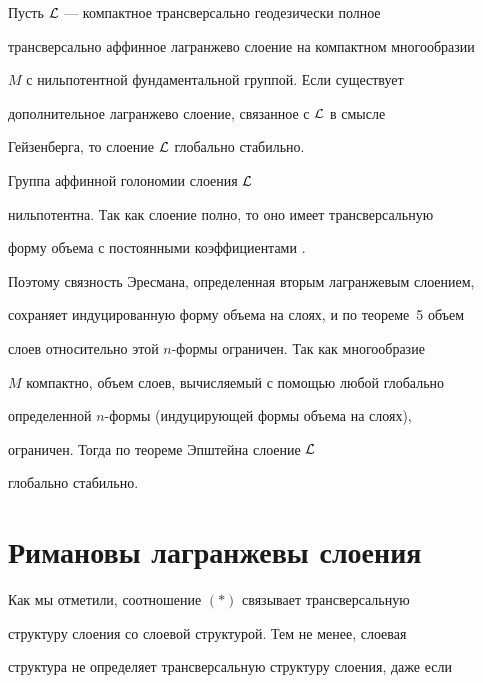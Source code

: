 \begin{thm}


Пусть $\cal L$ --- компактное трансверсально геодезически полное


трансверсально аффинное лагранжево слоение на компактном многообразии


$M$ с нильпотентной фундаментальной группой. Если существует


дополнительное лагранжево слоение, связанное с $\cal L$ в смысле


Гейзенберга, то слоение $\cal L$ глобально стабильно.


\end{thm}





\begin{pf} Группа аффинной голономии слоения $\cal L$


нильпотентна. Так как слоение полно, то оно имеет трансверсальную


форму объема с постоянными коэффициентами \cite{WO6}.


Поэтому связность Эресмана, определенная вторым лагранжевым слоением,


сохраняет индуцированную форму объема на слоях, и по теореме~5 объем


слоев относительно этой $n$-формы ограничен. Так как многообразие


$M$ компактно, объем слоев, вычисляемый с помощью любой глобально


определенной $n$-формы (индуцирующей формы объема на слоях),


ограничен. Тогда по теореме Эпштейна \cite{EP} слоение $\cal L$


глобально стабильно.


\end{pf}





\section{Римановы лагранжевы слоения}





Как мы отметили, соотношение $(*)$ связывает трансверсальную


структуру слоения со слоевой структурой. Тем не менее, слоевая


структура не определяет трансверсальную структуру слоения, даже если


